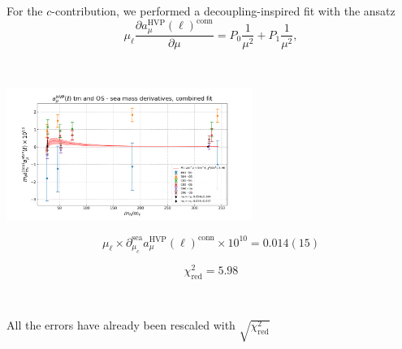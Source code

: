 \documentclass[xcolor={dvipsnames,table}]{beamer}
\begin{document}
\begin{frame}
\centering
    For the $c$-contribution, we performed a decoupling-inspired fit with the ansatz
    \[
   \mu_\ell  \frac{\partial a_\mu^\mathrm{HVP}(\ell)^\mathrm{conn} }{\partial\mu} = P_0\frac{1}{\mu^2}+P_1\frac{1}{\mu^2},
    \]
    
    \
    
     \includegraphics[trim=0cm 0.3cm 0cm 1.2cm, clip,width=0.6\textwidth]{plots/der_mq_sea_lore/fit_amu_der_mc_full.png}

        $$\mu_\ell\times\partial^\mathrm{sea}_{\mu_c}a^\mathrm{HVP}_\mu(\ell)^\mathrm{conn}\times10^{10} = 0.014(15)$$
        
        $$\chi^2_\mathrm{red}=5.98$$

        \
        
    All the errors have already been rescaled with $\sqrt{\chi^2_\mathrm{red}}$
\end{frame}
\end{document}
